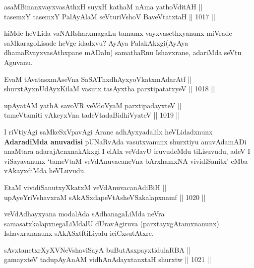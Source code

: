 \begin{shl}
asaMBinanxvayxvasAthxH suyxH kathaM nAma yathoVditAH || \\
tasemxY tasemxY PalAyAlaM seVturiVshoV BaveVtatxtaH \hfill || 1017 ||  
\end{shl}

\begin{artha}
hiMde heVLida vaNARsharxmagaLu tamamx vayxvasethxyanunx miVrade saMkaragoLisade heVge idadxvu? AyAya PalakAkxgi(AyAya dhamaRvayxvasAthxpane mADalu) samathaRnu Ishavxrane, adariMda seVtu Aguvanu.
\end{artha}


\begin{shl}
EvaM tAvatasxmAseVna SaSAThxdhAyxyoVkatxmAdarAtf || \\
shurxtAyx\s nUdAyxKilaM vasutx tasAyxtha parxtipatatxyeV \hfill || 1018 ||  
\end{shl}
				
\begin{shl}
upAyatAM yathA savoVR veVdoV\s yaM parxtipadayxteV || \\
tameVtamiti vAkeyxVna tadeVtadaBidhiVyateV \hfill || 1019 ||  
\end{shl}

\begin{artha}
I riVtiyAgi saMkeSxVpavAgi Arane adhAyxyadalilx heVLidadxnunx \textbf{AdaradiMda anuvadisi}
pUNaRvAda vasutxvanunx shurxtiyu anuvAdamADi anaMtara adarajAcnxnakAkxgi I elAlx veVdavU iruvudeMdu tiLisuvudu, adeV I viSayavanunx `tameVtaM veVdAnuvacaneVna bArxhamxNA vividiSanitx' eMba vAkayxdiMda heVLuvudu.
\end{artha}


\begin{shl}
EtaM vividiSanutxyXkatxM veVdAnuvacanAdiBiH || \\
upAyeYriVshavxraM sAkASxdapeVtAsheVSakalapxnamf \hfill || 1020 ||  
\end{shl}

\begin{artha}
veVdAdhayxyana modalAda sAdhanagaLiMda neVra samasatxkalapxnegaLiMdalU dUravAgiruva (parxtayxgAtamxnanunx) Ishavxrananunx sAkASxtf\break tiLiyalu iciCxsutAtxre.
\end{artha}

\begin{shl}
sAvxtanetxrXyXVNeVshaviSayA buButAsx\s payxtidulaRBA || \\
gamayxteV tadupAyAnAM vidhAnAdayxtanxtaH shurxtw \hfill || 1021 ||  
\end{shl}

